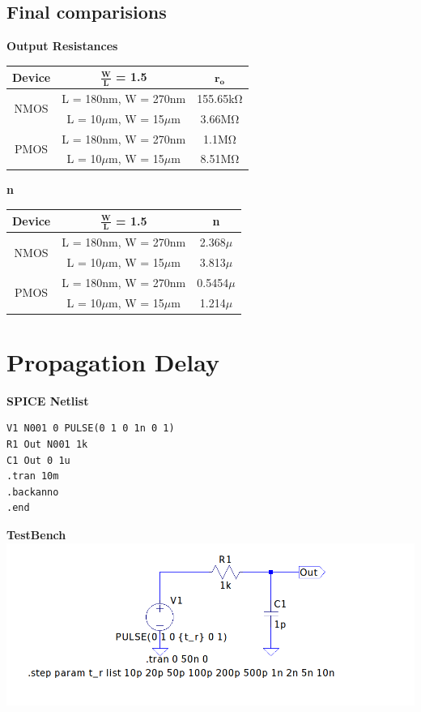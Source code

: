 \documentclass{article}
\begin{document}
\subsection*{Final comparisions}
\textbf{Output Resistances}
\begin{center}
\begin{tabular}{|c|c|c|}
\hline
\textbf{Device} & $\mathbf{\frac{W}{L}}$ \textbf{= 1.5} & $\mathbf{r_o}$ \\
\hline
\multirow{2}{*}{NMOS} & L = 180nm, W = 270nm & 155.65k$\si{\ohm}$\\
					& L = 10$\mu$m, W = 15$\mu$m & 3.66M$\si{\ohm}$\\
\hline
\multirow{2}{*}{PMOS} & L = 180nm, W = 270nm & 1.1M$\si{\ohm}$\\
					& L = 10$\mu$m, W = 15$\mu$m & 8.51M$\si{\ohm}$\\
\hline
\end{tabular}
\end{center}

\textbf{n}
\begin{center}
\begin{tabular}{|c|c|c|}
\hline
\textbf{Device} & $\mathbf{\frac{W}{L}}$ \textbf{= 1.5} & \textbf{n} \\
\hline
\multirow{2}{*}{NMOS} & L = 180nm, W = 270nm & 2.368$\mu$\\
					& L = 10$\mu$m, W = 15$\mu$m & 3.813$\mu$\\
\hline
\multirow{2}{*}{PMOS} & L = 180nm, W = 270nm & 0.5454$\mu$\\
					& L = 10$\mu$m, W = 15$\mu$m & 1.214$\mu$\\
\hline
\end{tabular}
\end{center}

\section{Propagation Delay}
\textbf{SPICE Netlist}
\begin{lstlisting}
V1 N001 0 PULSE(0 1 0 1n 0 1)
R1 Out N001 1k
C1 Out 0 1u
.tran 10m
.backanno
.end
\end{lstlisting}
\textbf{TestBench}\\
\includegraphics[scale=0.45]{./figs/Q5_tb.png}
\end{document}
